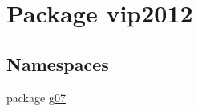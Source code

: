 \hypertarget{namespacevip2012}{\section{Package vip2012}
\label{d6/ddd/namespacevip2012}
}
\subsection*{Namespaces}
\begin{DoxyCompactItemize}
\item 
package \hyperlink{namespacevip2012_1_1g07}{g07}
\end{DoxyCompactItemize}
